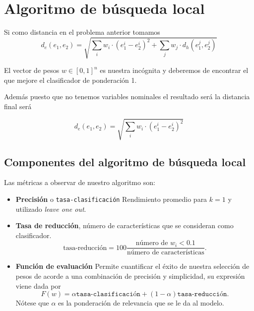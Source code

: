 \section{Algoritmo de búsqueda local}  

Si como distancia en el problema anterior tomamos 
\begin{equation}
    d_e(e_1, e_2)
     = 
     \sqrt{
         \sum_i
             w_i \cdot (e^i_1 - e^i_2)^2  
        +
        \sum_j w_j \cdot d_h(e_1^j, e_2^j)
         }
\end{equation}

El vector de pesos $w \in [0,1]^n$ es nuestra incógnita
y deberemos de encontrar el que mejore el clasificador de ponderación 1.

Además puesto que no tenemos variables nominales el resultado será
la distancia final será 

\begin{equation}
  d_e(e_1, e_2)
   = 
   \sqrt{
       \sum_i
           w_i \cdot (e^i_1 - e^i_2)^2  
       }
\end{equation}

\subsection{Componentes del algoritmo de búsqueda local}  

Las métricas a observar de nuestro algoritmo son: 

\begin{itemize}
    \item \textbf{Precisión} o \texttt{tasa-clasificación} Rendimiento promedio para $k=1$ y utilizado \textit{leave one out}.
    \item \textbf{Tasa de reducción}, número de características que se consideran como clasificador. 
    \begin{equation}
        \text{tasa-reducción} 
        = 
        100
        \frac{\text{número de }w_i < 0.1}{\text{número de características}}.
    \end{equation}
    \item \textbf{Función de evaluación} Permite cuantificar el éxito de nuestra selección de pesos de acorde a una  combinación de precisión y simplicidad, su expresión viene dada por 
    \begin{equation}
        F(w) = 
            \alpha \texttt{tasa-clasificación}
            +
            (1 - \alpha) \texttt{tasa-reducción}.
    \end{equation}
    Nótese que $\alpha$ es la ponderación de relevancia que se le da al modelo.
\end{itemize}

